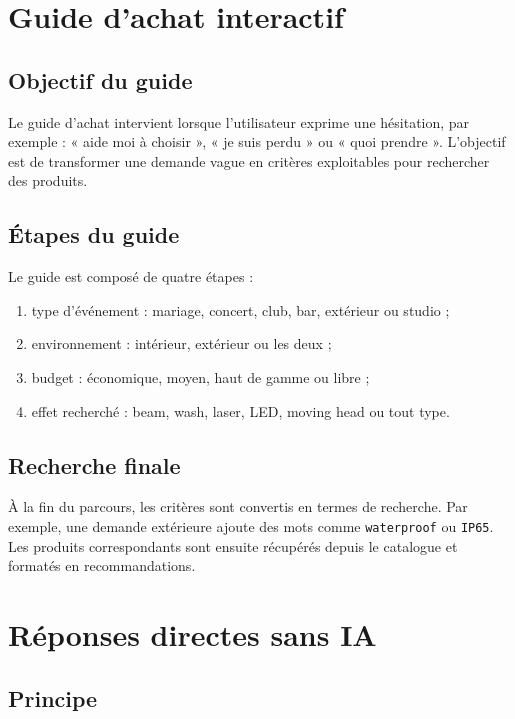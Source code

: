 \documentclass[12pt,a4paper]{report}
\begin{document}
\chapter{Guide d'achat interactif}

\section{Objectif du guide}

Le guide d'achat intervient lorsque l'utilisateur exprime une hésitation, par exemple : « aide moi à choisir », « je suis perdu » ou « quoi prendre ». L'objectif est de transformer une demande vague en critères exploitables pour rechercher des produits.

\section{Étapes du guide}

Le guide est composé de quatre étapes :

\begin{enumerate}
    \item type d'événement : mariage, concert, club, bar, extérieur ou studio ;
    \item environnement : intérieur, extérieur ou les deux ;
    \item budget : économique, moyen, haut de gamme ou libre ;
    \item effet recherché : beam, wash, laser, LED, moving head ou tout type.
\end{enumerate}

\section{Recherche finale}

À la fin du parcours, les critères sont convertis en termes de recherche. Par exemple, une demande extérieure ajoute des mots comme \texttt{waterproof} ou \texttt{IP65}. Les produits correspondants sont ensuite récupérés depuis le catalogue et formatés en recommandations.

\chapter{Réponses directes sans IA}

\section{Principe}
\end{document}
